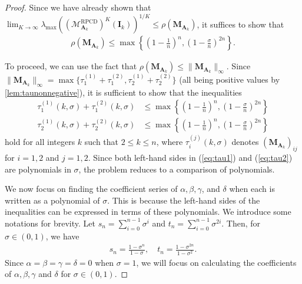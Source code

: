 \documentclass{article}
\theoremstyle{plain}
\theoremstyle{definition}
\theoremstyle{remark}
\def\bigopen#1{\left(#1\right)}
\def\bigset#1{\left\{#1\right\}}
\newcommand{\RPCD}{\text{RPCD}} %
\def\mA{{\bm{A}}}
\def\mI{{\bm{I}}}
\def\mM{{\bm{M}}}
\def\gM{{\mathcal{M}}}
\begin{document}
\begin{proof}
Since we have already shown that $\lim_{K\to\infty} \lambda_{\max}((\gM_{\mA_k}^{\RPCD})^K (\mI_k))^{1/K} \le \rho(\mM_{\mA_k})$, it suffices to show that 
\begin{align*}
    \rho(\mM_{\mA_k}) \le \max \bigset{\bigopen{1 - \frac{1}{n}}^n, \bigopen{1 - \frac{\sigma}{n}}^{2n}}.
\end{align*}

To proceed, we can use the fact that $\rho(\mM_{\mA_k}) \le \|\mM_{\mA_k}\|_{\infty}$.
Since $\|\mM_{\mA_k}\|_{\infty} = \max \{ \tau_1^{(1)} + \tau_1^{(2)}, \tau_2^{(1)} + \tau_2^{(2)}\}$ (all being positive values by \cref{lem:taunonnegative}), it is sufficient to show that the inequalities 
\begin{align}
    \tau_1^{(1)}(k, \sigma) + \tau_1^{(2)}(k, \sigma) &\le \max \bigset{\bigopen{1 - \frac{1}{n}}^n, \bigopen{1 - \frac{\sigma}{n}}^{2n}} \label{eq:tau1} \\
    \tau_2^{(1)}(k, \sigma) + \tau_2^{(2)}(k, \sigma) &\le \max \bigset{\bigopen{1 - \frac{1}{n}}^n, \bigopen{1 - \frac{\sigma}{n}}^{2n}} \label{eq:tau2}
\end{align}
hold for all integers $k$ such that $2 \le k \le n$, where $\tau_i^{(j)}(k, \sigma)$ denotes $(\mM_{\mA_k})_{ij}$ for $i=1,2$ and $j=1,2$. Since both left-hand sides in (\ref{eq:tau1}) and (\ref{eq:tau2}) are polynomials in $\sigma$, the problem reduces to a comparison of polynomials. 

We now focus on finding the coefficient series of $\alpha, \beta, \gamma$, and $\delta$ when each is written as a polynomial of $\sigma$. 
This is because the left-hand sides of the inequalities can be expressed in terms of these polynomials.
We introduce some notations for brevity. 
Let $s_n = \sum_{i=0}^{n-1}\sigma^i$ and $t_n = \sum_{i=0}^{n-1}\sigma^{2i}$.
Then, for $\sigma \in (0, 1)$, we have 
\begin{align*}
    s_n = \frac{1-\sigma^n}{1-\sigma}, \quad t_n = \frac{1-\sigma^{2n}}{1-\sigma^2}.
\end{align*}
Since $\alpha=\beta=\gamma=\delta=0$ when $\sigma=1$, we will focus on calculating the coefficients of $\alpha, \beta, \gamma$ and $\delta$ for $\sigma\in (0, 1)$.


\end{proof}
\end{document}
